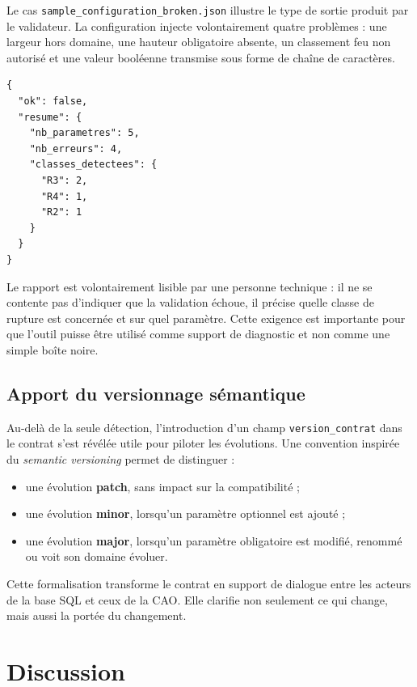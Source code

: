 Le cas \texttt{sample\_configuration\_broken.json} illustre le type de sortie produit par le validateur. La configuration injecte volontairement quatre problèmes : une largeur hors domaine, une hauteur obligatoire absente, un classement feu non autorisé et une valeur booléenne transmise sous forme de chaîne de caractères.

\begin{lstlisting}[language=jsonmemoire,caption={Extrait simplifié du rapport d'erreurs généré}]
{
  "ok": false,
  "resume": {
    "nb_parametres": 5,
    "nb_erreurs": 4,
    "classes_detectees": {
      "R3": 2,
      "R4": 1,
      "R2": 1
    }
  }
}
\end{lstlisting}

Le rapport est volontairement lisible par une personne technique : il ne se contente pas d'indiquer que la validation échoue, il précise quelle classe de rupture est concernée et sur quel paramètre. Cette exigence est importante pour que l'outil puisse être utilisé comme support de diagnostic et non comme une simple boîte noire.

\subsection{Apport du versionnage sémantique}

Au-delà de la seule détection, l'introduction d'un champ \texttt{version\_contrat} dans le contrat s'est révélée utile pour piloter les évolutions. Une convention inspirée du \textit{semantic versioning} permet de distinguer :

\begin{itemize}[leftmargin=1.4cm]
\item une évolution \textbf{patch}, sans impact sur la compatibilité ;
\item une évolution \textbf{minor}, lorsqu'un paramètre optionnel est ajouté ;
\item une évolution \textbf{major}, lorsqu'un paramètre obligatoire est modifié, renommé ou voit son domaine évoluer.
\end{itemize}

Cette formalisation transforme le contrat en support de dialogue entre les acteurs de la base SQL et ceux de la CAO. Elle clarifie non seulement ce qui change, mais aussi la portée du changement.

\section{Discussion}

